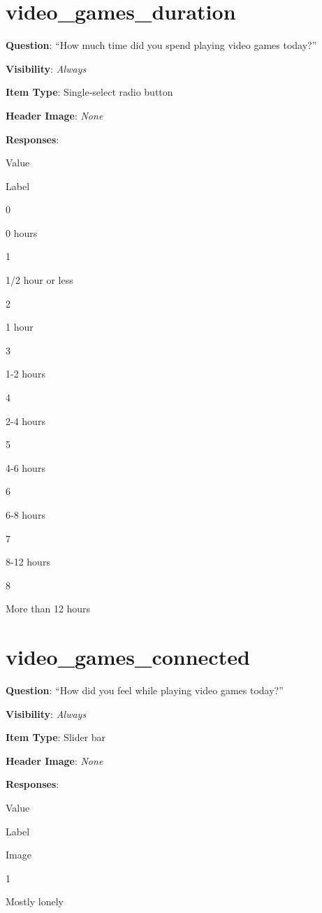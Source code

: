 \documentclass[]{book}
\begin{document}
\hypertarget{video_games_duration}{%
\section{video\_games\_duration}\label{video_games_duration}}

\textbf{Question}: ``How much time did you spend playing video games today?''

\textbf{Visibility}: \emph{Always}

\textbf{Item Type}: Single-select radio button

\textbf{Header Image}: \emph{None}

\textbf{Responses}:

Value

Label

0

0 hours

1

1/2 hour or less

2

1 hour

3

1-2 hours

4

2-4 hours

5

4-6 hours

6

6-8 hours

7

8-12 hours

8

More than 12 hours

\hypertarget{video_games_connected}{%
\section{video\_games\_connected}\label{video_games_connected}}

\textbf{Question}: ``How did you feel while playing video games today?''

\textbf{Visibility}: \emph{Always}

\textbf{Item Type}: Slider bar

\textbf{Header Image}: \emph{None}

\textbf{Responses}:

Value

Label

Image

1

Mostly lonely
\end{document}
